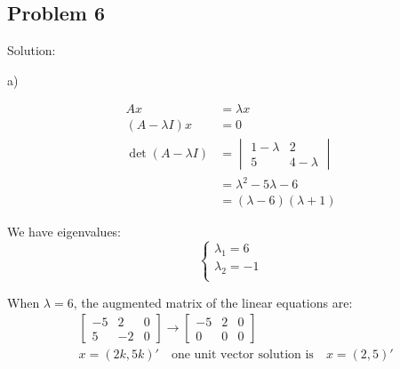 \documentclass[letterpaper, 11pt]{article}
\newcommand{\1}{\mathds{1}}	%
\theoremstyle{definition}
\begin{document}
\subsection*{Problem 6}

Solution:

a)

\begin{align*}
    Ax                   & =\lambda x                     \\
    (A-\lambda I) x      & = 0                            \\
    \det (A - \lambda I) & =\begin{vmatrix}
                                1- \lambda & 2         \\
                                5          & 4-\lambda
                            \end{vmatrix}        \\
                         & = \lambda ^{2} - 5 \lambda - 6 \\
                         & = (\lambda-6)(\lambda + 1)
\end{align*}

We have eigenvalues: \begin{equation*}
    \left\{\begin{array}{l}
        \lambda_{1} = 6  \\
        \lambda_{2} = -1 \\
    \end{array}\right.
\end{equation*}

When $\lambda=6$, the augmented matrix of the linear equations are:
\begin{align*}
     & \left[\begin{array}{cc|c}
                     -5 & 2  & 0 \\
                     5  & -2 & 0
                 \end{array}\right] \to \left[\begin{array}{cc|c}
                                                  -5 & 2 & 0 \\
                                                  0  & 0 & 0
                                              \end{array}\right]                   \\
     & x = (2k , 5k)'\quad \text{one unit vector solution is} \quad x = (2,5)'
\end{align*}
\end{document}

